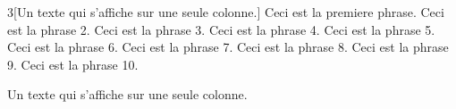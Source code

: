 \documentclass{article}
\begin{document}
	
	\begin{multicols}{3}[Un texte qui s'affiche sur une seule colonne.]
		Ceci est la premiere phrase. Ceci est la phrase 2.
		Ceci est la phrase 3. Ceci est la phrase 4.
		Ceci est la phrase 5. Ceci est la phrase 6.
		Ceci est la phrase 7. Ceci est la phrase 8.
		Ceci est la phrase 9. Ceci est la phrase 10.
	\end{multicols}

	Un texte qui s'affiche sur une seule colonne.
	
\end{document}
